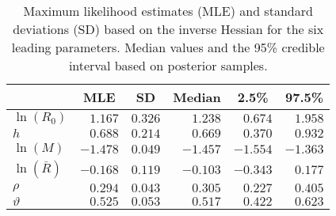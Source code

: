 %
\begin{table}[!tbp]
 \caption{Maximum likelihood estimates (MLE) and standard deviations (SD)
				based on the inverse Hessian for the six leading parameters. Median
				values and the 95\% credible interval based on posterior samples.\label{iscam.T2}} 
 \begin{center}
 \begin{tabular}{lrrrrr}\hline\hline
\multicolumn{1}{l}{}&\multicolumn{1}{c}{MLE}&\multicolumn{1}{c}{SD}&\multicolumn{1}{c}{Median}&\multicolumn{1}{c}{2.5\%}&\multicolumn{1}{c}{97.5\%}\tabularnewline
\hline
$\ln(R_0)$&$ 1.167$&$0.326$&$ 1.238$&$ 0.674$&$ 1.958$\tabularnewline
$h$&$ 0.688$&$0.214$&$ 0.669$&$ 0.370$&$ 0.932$\tabularnewline
$\ln(M)$&$-1.478$&$0.049$&$-1.457$&$-1.554$&$-1.363$\tabularnewline
$\ln(\bar{R})$&$-0.168$&$0.119$&$-0.103$&$-0.343$&$ 0.177$\tabularnewline
$\rho$&$ 0.294$&$0.043$&$ 0.305$&$ 0.227$&$ 0.405$\tabularnewline
$\vartheta$&$ 0.525$&$0.053$&$ 0.517$&$ 0.422$&$ 0.623$\tabularnewline
\hline
\end{tabular}

\end{center}

\end{table}

